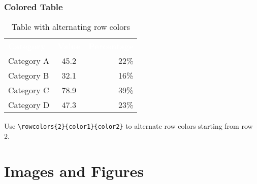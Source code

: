 \documentclass[aspectratio=169,professionalfonts]{beamer}
\begin{document}
\begin{frame}
    \frametitle{Colored Table}
    
    \begin{table}
        \centering
        \begin{tabular}{lcr}
            \rowcolor{ugmBlue!40}
            \textcolor{white}{\textbf{Category}} & \textcolor{white}{\textbf{Value}} & \textcolor{white}{\textbf{Percentage}} \\
            Category A & 45.2 & 22\% \\
            Category B & 32.1 & 16\% \\
            Category C & 78.9 & 39\% \\
            Category D & 47.3 & 23\% \\
        \end{tabular}
        \caption{Table with alternating row colors}
    \end{table}
    
    \begin{tcolorbox}[colback=ugmLightGrey,colframe=ugmBlue,title=Color Tip]
        Use \texttt{\textbackslash rowcolors\{2\}\{color1\}\{color2\}} to alternate row colors starting from row 2.
    \end{tcolorbox}
\end{frame}

\section{Images and Figures}
\end{document}
